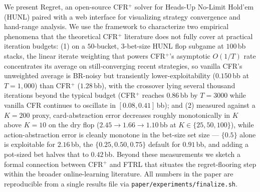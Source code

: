 We present Regret, an open-source CFR$^+$ solver for Heads-Up No-Limit
Hold'em (HUNL) paired with a web interface for visualizing strategy
convergence and hand-range analysis. We use the framework to characterize
two empirical phenomena that the theoretical CFR$^+$ literature does not
fully cover at practical iteration budgets: (1) on a $50$-bucket,
$3$-bet-size HUNL flop subgame at $100$\,bb stacks, the linear iterate
weighting that powers CFR$^+$'s asymptotic $O(1/T)$ rate concentrates
its average on still-converging recent strategies, so vanilla CFR's
unweighted average is BR-noisy but transiently lower-exploitability
($0.150$\,bb at $T\!=\!1{,}000$) than CFR$^+$ ($1.28$\,bb), with the
crossover lying several thousand iterations beyond the typical budget
(CFR$^+$ reaches $0.86$\,bb by $T\!=\!3000$ while vanilla CFR continues
to oscillate in $[0.08, 0.41]$\,bb); and (2) measured against a
$K\!=\!200$ proxy, card-abstraction error decreases roughly monotonically
in $K$ above $K\!=\!10$ on the dry flop ($2.45 \to 1.66 \to 1.10$\,bb at
$K\!\in\!\{25, 50, 100\}$), while action-abstraction error is cleanly
monotone in the bet-size set size --- $\{0.5\}$ alone is exploitable for
$2.16$\,bb, the $\{0.25,0.50,0.75\}$ default for $0.91$\,bb, and adding
a pot-sized bet halves that to $0.42$\,bb. Beyond these measurements we
sketch a formal connection between CFR$^+$ and FTRL that situates the
regret-flooring step within the broader online-learning literature.
All numbers in the paper are reproducible from a single results file
via \texttt{paper/experiments/finalize.sh}.
